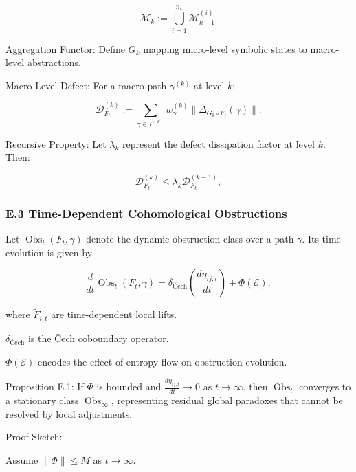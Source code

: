 \documentclass[12pt]{article}
\theoremstyle{plain}
\begin{document}
\begin{equation}
\mathcal{M}_k := \bigcup_{i=1}^{n_k} \mathcal{M}_{k-1}^{(i)}.
\end{equation}

Aggregation Functor: Define \(G_k\) mapping micro-level symbolic states to macro-level abstractions.

Macro-Level Defect: For a macro-path \(\gamma^{(k)}\) at level \(k\):

\begin{equation}
\mathcal{D}_{F_t}^{(k)} := \sum_{\gamma \in \Gamma^{(k)}} w_\gamma^{(k)} \|\Delta_{G_k \circ F_t}(\gamma)\|.
\end{equation}

Recursive Property: Let \(\lambda_k\) represent the defect dissipation factor at level \(k\). Then:

\begin{equation}
\mathcal{D}_{F_t}^{(k)} \leq \lambda_k \mathcal{D}_{F_t}^{(k-1)},
\end{equation}

\subsubsection*{E.3 Time-Dependent Cohomological Obstructions}

Let \(\operatorname{Obs}_t(F_t, \gamma)\) denote the dynamic obstruction class over a path \(\gamma\). Its time evolution is given by

\begin{equation}
\frac{d}{dt} \operatorname{Obs}_t(F_t, \gamma) = \delta_{\text{Čech}} \left( \frac{d \eta_{ij,t}}{dt} \right) + \Phi(\mathcal{E}),
\end{equation}

where \(\widetilde{F}_{i,t}\) are time-dependent local lifts.

\(\delta_{\text{Čech}}\) is the Čech coboundary operator.

\(\Phi(\mathcal{E})\) encodes the effect of entropy flow on obstruction evolution.

Proposition E.1: If \(\Phi\) is bounded and \(\frac{d \eta_{ij,t}}{dt} \to 0\) as \(t \to \infty\), then \(\operatorname{Obs}_t\) converges to a stationary class \(\operatorname{Obs}_\infty\), representing residual global paradoxes that cannot be resolved by local adjustments.

Proof Sketch:

Assume \(\|\Phi\| \leq M\) as \(t \to \infty\).
\end{document}
